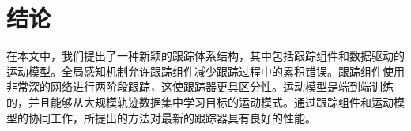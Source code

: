 \section{结论}
\label{sec:conclusion}

在本文中，我们提出了一种新颖的跟踪体系结构，其中包括跟踪组件和数据驱动的运动模型。全局感知机制允许跟踪组件减少跟踪过程中的累积错误。跟踪组件使用非常深的网络进行两阶段跟踪，这使跟踪器更具区分性。运动模型是端到端训练的，并且能够从大规模轨迹数据集中学习目标的运动模式。通过跟踪组件和运动模型的协同工作，所提出的方法对最新的跟踪器具有良好的性能。